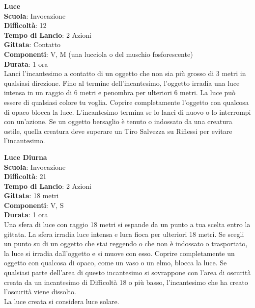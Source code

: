 \begin{multicols}{2}
\medskip\textbf{Luce}\\
\textbf{Scuola}: Invocazione\\
\textbf{Difficoltà}: 12\\
\textbf{Tempo di Lancio}: 2 Azioni\\
\textbf{Gittata}: Contatto\\
\textbf{Componenti}: V, M (una lucciola o del muschio fosforescente)\\
\textbf{Durata}: 1 ora\\
Lanci l'incantesimo a contatto di un oggetto che non sia più grosso di 3 metri in qualsiasi direzione. Fino al termine dell'incantesimo, l'oggetto irradia una luce intensa in un raggio di 6 metri e penombra per ulteriori 6 metri. La luce può essere di qualsiasi colore tu voglia. Coprire completamente l'oggetto con qualcosa di opaco blocca la luce. L'incantesimo termina se lo lanci di nuovo o lo interrompi con un'azione. Se un oggetto bersaglio è tenuto o indossato da una creatura ostile, quella creatura deve superare un Tiro Salvezza su Riflessi per evitare l'incantesimo. 

\medskip\textbf{Luce Diurna}\\
\textbf{Scuola}: Invocazione\\
\textbf{Difficoltà}: 21\\
\textbf{Tempo di Lancio}: 2 Azioni\\
\textbf{Gittata}: 18 metri\\
\textbf{Componenti}: V, S\\
\textbf{Durata}: 1 ora\\
Una sfera di luce con raggio 18 metri si espande da un punto a tua scelta entro la gittata. La sfera irradia luce intensa e luca fioca per ulteriori 18 metri. Se scegli un punto su di un oggetto che stai reggendo o che non è indossato o trasportato, la luce si irradia dall'oggetto e si muove con esso. Coprire completamente un oggetto con qualcosa di opaco, come un vaso o un elmo, blocca la luce. Se qualsiasi parte dell'area di questo incantesimo si sovrappone con l'area di oscurità creata da un incantesimo di Difficoltà 18 o più basso, l'incantesimo che ha creato l'oscurità viene dissolto.\\
La luce creata si considera luce solare.


\end{multicols}

